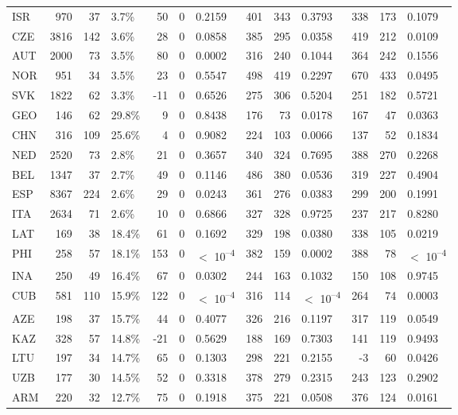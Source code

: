 \begin{tabular}[t]{lrrlrrlrrlrrl}
ISR & 970 & 37 & 3.7\% & 50 & 0 & 0.2159 & 401 & 343 & 0.3793 & 338 & 173 & 0.1079\\
CZE & 3816 & 142 & 3.6\% & 28 & 0 & 0.0858 & 385 & 295 & 0.0358 & 419 & 212 & 0.0109\\
AUT & 2000 & 73 & 3.5\% & 80 & 0 & 0.0002 & 316 & 240 & 0.1044 & 364 & 242 & 0.1556\\
NOR & 951 & 34 & 3.5\% & 23 & 0 & 0.5547 & 498 & 419 & 0.2297 & 670 & 433 & 0.0495\\
SVK & 1822 & 62 & 3.3\% & -11 & 0 & 0.6526 & 275 & 306 & 0.5204 & 251 & 182 & 0.5721\\
GEO & 146 & 62 & 29.8\% & 9 & 0 & 0.8438 & 176 & 73 & 0.0178 & 167 & 47 & 0.0363\\
CHN & 316 & 109 & 25.6\% & 4 & 0 & 0.9082 & 224 & 103 & 0.0066 & 137 & 52 & 0.1834\\
NED & 2520 & 73 & 2.8\% & 21 & 0 & 0.3657 & 340 & 324 & 0.7695 & 388 & 270 & 0.2268\\
BEL & 1347 & 37 & 2.7\% & 49 & 0 & 0.1146 & 486 & 380 & 0.0536 & 319 & 227 & 0.4904\\
ESP & 8367 & 224 & 2.6\% & 29 & 0 & 0.0243 & 361 & 276 & 0.0383 & 299 & 200 & 0.1991\\
ITA & 2634 & 71 & 2.6\% & 10 & 0 & 0.6866 & 327 & 328 & 0.9725 & 237 & 217 & 0.8280\\
LAT & 169 & 38 & 18.4\% & 61 & 0 & 0.1692 & 329 & 198 & 0.0380 & 338 & 105 & 0.0219\\
PHI & 258 & 57 & 18.1\% & 153 & 0 & $<$ 10\textsuperscript{--4} & 382 & 159 & 0.0002 & 388 & 78 & $<$ 10\textsuperscript{--4}\\
INA & 250 & 49 & 16.4\% & 67 & 0 & 0.0302 & 244 & 163 & 0.1032 & 150 & 108 & 0.9745\\
CUB & 581 & 110 & 15.9\% & 122 & 0 & $<$ 10\textsuperscript{--4} & 316 & 114 & $<$ 10\textsuperscript{--4} & 264 & 74 & 0.0003\\
AZE & 198 & 37 & 15.7\% & 44 & 0 & 0.4077 & 326 & 216 & 0.1197 & 317 & 119 & 0.0549\\
KAZ & 328 & 57 & 14.8\% & -21 & 0 & 0.5629 & 188 & 169 & 0.7303 & 141 & 119 & 0.9493\\
LTU & 197 & 34 & 14.7\% & 65 & 0 & 0.1303 & 298 & 221 & 0.2155 & -3 & 60 & 0.0426\\
UZB & 177 & 30 & 14.5\% & 52 & 0 & 0.3318 & 378 & 279 & 0.2315 & 243 & 123 & 0.2902\\
ARM & 220 & 32 & 12.7\% & 75 & 0 & 0.1918 & 375 & 221 & 0.0508 & 376 & 124 & 0.0161\\

\end{tabular}
